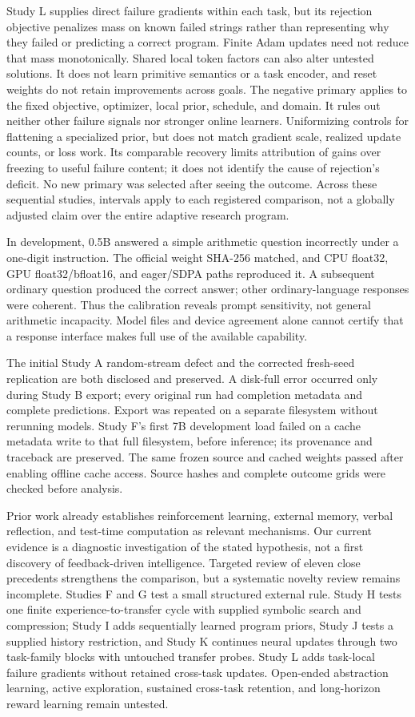 \documentclass[11pt]{article}
\begin{document}
Study L supplies direct failure gradients within each task, but its rejection
objective penalizes mass on known failed strings rather than representing why
they failed or predicting a correct program. Finite Adam updates need not
reduce that mass monotonically. Shared local token factors can
also alter untested solutions. It does not learn primitive semantics or a
task encoder, and reset weights do not retain improvements across goals.
The negative primary applies to the fixed objective, optimizer, local prior,
schedule, and domain. It rules out neither other failure signals nor stronger
online learners. Uniformizing controls for flattening a specialized prior,
but does not match gradient scale, realized update counts, or loss work.
Its comparable recovery limits attribution of gains over freezing to useful
failure content; it does not identify the cause of rejection's deficit.
No new primary was selected after seeing the outcome. Across these sequential
studies, intervals apply to each registered comparison, not a globally adjusted
claim over the entire adaptive research program.

In development, 0.5B answered a simple arithmetic question incorrectly under
a one-digit instruction. The official weight SHA-256 matched, and CPU float32,
GPU float32/bfloat16, and eager/SDPA paths reproduced it. A subsequent ordinary
question produced the correct answer; other ordinary-language responses were
coherent. Thus the calibration reveals prompt sensitivity, not general
arithmetic incapacity. Model files and device agreement alone cannot certify
that a response interface makes full use of the available capability.

The initial Study A random-stream defect and the corrected fresh-seed
replication are both disclosed and preserved. A disk-full error occurred only
during Study B export; every original run had completion metadata and complete
predictions. Export was repeated on a separate filesystem without rerunning
models. Study F's first 7B development load failed on a cache metadata write
to that full filesystem, before inference; its provenance and traceback are
preserved. The same frozen source and cached weights passed after enabling
offline cache access. Source hashes and complete outcome grids were checked
before analysis.

Prior work already establishes reinforcement learning, external memory,
verbal reflection, and test-time computation as relevant mechanisms. Our
current evidence is a diagnostic investigation of the stated hypothesis, not
a first discovery of feedback-driven intelligence. Targeted review of eleven
close precedents strengthens the comparison, but a systematic novelty review
remains incomplete. Studies F and G test a small structured external rule.
Study H tests one finite experience-to-transfer cycle with supplied symbolic
search and compression; Study I adds sequentially learned program priors,
Study J tests a supplied history restriction, and Study K continues neural
updates through two task-family blocks with untouched transfer probes.
Study L adds task-local failure gradients without retained cross-task updates.
Open-ended abstraction learning, active exploration,
sustained cross-task retention, and long-horizon reward learning remain untested.
\end{document}
